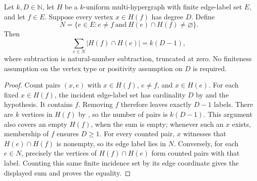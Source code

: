 \begin{helper}
Let \(k,D\in\mathbb N\), let \(H\) be a \(k\)-uniform multi-hypergraph
with finite edge-label set \(E\), and let \(f\in E\).
Suppose every vertex \(x\in H(f)\) has degree \(D\). Define
\[
N=\{e\in E:e\ne f\ \text{and}\ H(e)\cap H(f)\ne\varnothing\}.
\]
Then
\[
\sum_{e\in N}|H(f)\cap H(e)|=k(D-1),
\]
where subtraction is natural-number subtraction, truncated at zero.
No finiteness assumption on the vertex type or positivity assumption on
\(D\) is required.
\end{helper}
\begin{proof}
Count pairs \((x,e)\) with \(x\in H(f)\), \(e\ne f\), and \(x\in H(e)\).
For each fixed \(x\in H(f)\), the incident edge-label set has cardinality
\(D\) by  and the hypothesis. It contains \(f\).
Removing \(f\) therefore leaves exactly \(D-1\) labels. There are \(k\)
vertices in \(H(f)\) by , so the number of pairs
is \(k(D-1)\). This argument also covers an empty \(H(f)\), when the sum
is empty; whenever such an \(x\) exists, membership of \(f\) ensures
\(D\geq1\).
For every counted pair, \(x\) witnesses that \(H(e)\cap H(f)\) is
nonempty, so its edge label lies in \(N\). Conversely, for each
\(e\in N\), precisely the vertices of \(H(f)\cap H(e)\) form counted
pairs with that label. Counting this same finite incidence set by its
edge coordinate gives the displayed sum and proves the equality.
\end{proof}
